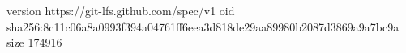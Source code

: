 version https://git-lfs.github.com/spec/v1
oid sha256:8c11c06a8a0993f394a04761ff6eea3d818de29aa89980b2087d3869a9a7bc9a
size 174916
